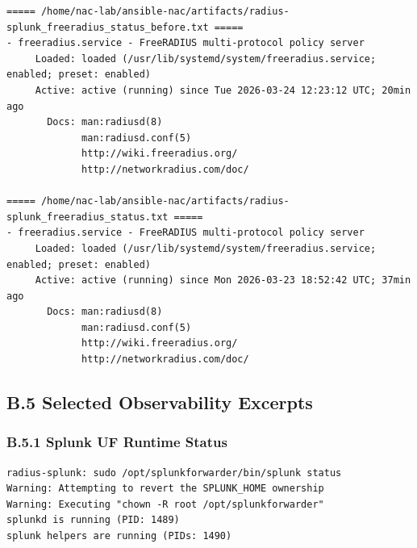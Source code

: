 \documentclass[11pt]{article}
\begin{document}
\begin{verbatim}
===== /home/nac-lab/ansible-nac/artifacts/radius-splunk_freeradius_status_before.txt =====
- freeradius.service - FreeRADIUS multi-protocol policy server
     Loaded: loaded (/usr/lib/systemd/system/freeradius.service; enabled; preset: enabled)
     Active: active (running) since Tue 2026-03-24 12:23:12 UTC; 20min ago
       Docs: man:radiusd(8)
             man:radiusd.conf(5)
             http://wiki.freeradius.org/
             http://networkradius.com/doc/

===== /home/nac-lab/ansible-nac/artifacts/radius-splunk_freeradius_status.txt =====
- freeradius.service - FreeRADIUS multi-protocol policy server
     Loaded: loaded (/usr/lib/systemd/system/freeradius.service; enabled; preset: enabled)
     Active: active (running) since Mon 2026-03-23 18:52:42 UTC; 37min ago
       Docs: man:radiusd(8)
             man:radiusd.conf(5)
             http://wiki.freeradius.org/
             http://networkradius.com/doc/
\end{verbatim}


\subsection{B.5 Selected Observability Excerpts}
\label{sec:appendix-b-selected-observability-excerpts}


\subsubsection{B.5.1 Splunk UF Runtime Status}
\label{sec:appendix-b-splunk-uf-runtime-status}

\begin{verbatim}
radius-splunk: sudo /opt/splunkforwarder/bin/splunk status
Warning: Attempting to revert the SPLUNK_HOME ownership
Warning: Executing "chown -R root /opt/splunkforwarder"
splunkd is running (PID: 1489)
splunk helpers are running (PIDs: 1490)
\end{verbatim}
\end{document}
